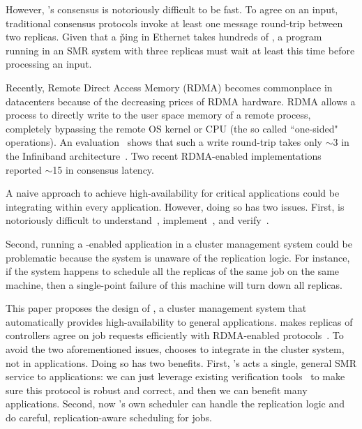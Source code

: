 

However, \paxos's consensus is notoriously difficult to be fast. 
To agree on an input, traditional consensus protocols invoke at least one 
message round-trip between two replicas. Given that a \v{ping} in Ethernet 
takes hundreds of \us, a program running in an SMR system with three replicas 
must wait at least this time before processing an input. 

Recently, Remote Direct Access Memory (RDMA) becomes commonplace in datacenters 
because of the decreasing prices of RDMA hardware. RDMA allows a process to 
directly write to the user space memory of a remote process, completely 
bypassing the remote OS kernel or CPU (the so called ``one-sided" operations). 
An evaluation~\cite{pilaf:usenix14} shows that such a write round-trip takes 
only $\sim$3 \us in the Infiniband architecture~\cite{infiniband}. Two recent 
RDMA-enabled \paxos implementations~\cite{dare:hpdc15,falcon:github} reported 
$\sim$15 \us in consensus latency.

A naive approach to achieve high-availability for critical applications could 
be integrating \paxos within every application. However, doing so has two 
issues. First, \paxos is notoriously difficult 
to understand~\cite{raft:usenix14}, implement~\cite{paxos:practical}, and 
verify~\cite{demeter:sosp11}.

Second, running a \paxos-enabled application in a 
cluster management system could be problematic because the system is unaware 
of the replication logic. For instance, if the system happens to schedule all 
the replicas of the same job on the same machine, then a single-point failure 
of this machine will turn down all replicas. 


This paper proposes the design of \xxx, a cluster management system that 
automatically provides high-availability to general applications. \xxx makes 
replicas of controllers agree on job requests efficiently with 
RDMA-enabled \paxos protocols~\cite{dare:hpdc15, falcon:github}. To avoid the 
two aforementioned issues, \xxx chooses to integrate \paxos in the 
cluster system, not in applications. Doing so has two benefits. First, \xxx's 
\paxos acts a single, general SMR service to applications: we can just 
leverage existing verification tools~\cite{modist:nsdi09,demeter:sosp11} to 
make sure this \paxos protocol is robust and correct, and then we can benefit 
many applications. Second, now \xxx's own scheduler can handle the 
replication logic and do careful, replication-aware scheduling for jobs.


